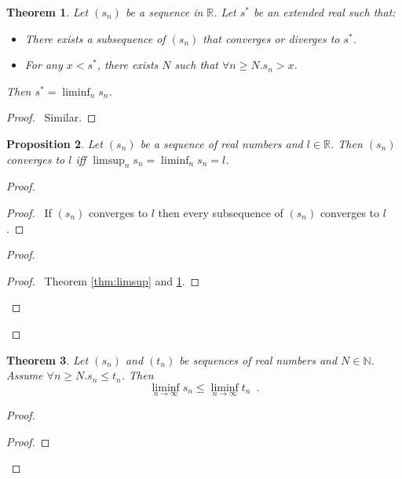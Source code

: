 \documentclass{book}
\let\qed\relax
\newtheorem{prop}{Proposition}[chapter]
\newtheorem{thm}[prop]{Theorem}
\theoremstyle{definition}
\begin{document}
\begin{thm}
\label{thm:liminf}
Let $(s_n)$ be a sequence in $\mathbb{R}$. Let $s^*$ be an extended real such that:
\begin{itemize}
\item There exists a subsequence of $(s_n)$ that converges or diverges to $s^*$.
\item For any $x < s^*$, there exists $N$ such that $\forall n \geq N. s_n > x$.
\end{itemize}
Then $s^* = \liminf_n s_n$.
\end{thm}

\begin{proof}
\pf\ Similar. \qed
\end{proof}

\begin{prop}
Let $(s_n)$ be a sequence of real numbers and $l \in \mathbb{R}$. Then $(s_n)$ converges to $l$ iff $\limsup_n s_n = \liminf_n s_n = l$.
\end{prop}

\begin{proof}
\pf
{}
\begin{proof}
	\pf\ If $(s_n)$ converges to $l$ then every subsequence of $(s_n)$ converges to $l$.
\end{proof}
\begin{proof}
	\begin{proof}
		\pf\ Theorem \ref{thm:limsup} and \ref{thm:liminf}.
	\end{proof}
\end{proof}
\qed
\end{proof}

\begin{thm}
Let $(s_n)$ and $(t_n)$ be sequences of real numbers and $N \in \mathbb{N}$. Assume $\forall n \geq N. s_n \leq t_n$. Then
\[ \liminf_{n \rightarrow \infty} s_n \leq \liminf_{n \rightarrow \infty} t_n \enspace . \]
\end{thm}

\begin{proof}
\pf
{}
\begin{proof}
\end{proof}
\qed
\end{proof}
\end{document}
